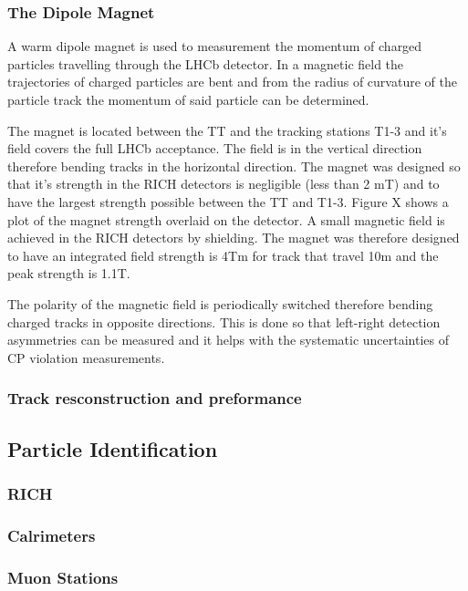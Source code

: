 \subsubsection{The Dipole Magnet}
A warm dipole magnet is used to measurement the momentum of charged particles travelling through the LHCb detector. In a magnetic field the trajectories of charged particles are bent and from the radius of curvature of the particle track the momentum of said particle can be determined.

The magnet is located between the TT and the tracking stations T1-3 and it’s field covers the full LHCb acceptance. The field is in the vertical direction therefore bending tracks in the horizontal direction. The magnet was designed so that it’s strength in the RICH detectors is negligible (less than 2 mT) and to have the largest strength possible between the TT and T1-3. Figure X shows a plot of the magnet strength overlaid on the detector. A small magnetic field is achieved in the RICH detectors by shielding. The magnet was therefore designed to have an integrated field strength is 4Tm for track that travel 10m and the peak strength is 1.1T. %

The polarity of the magnetic field is periodically switched therefore bending charged tracks in opposite directions. This is done so that left-right detection asymmetries can be measured and it helps with the systematic uncertainties of CP violation measurements. %

\subsubsection{Track resconstruction and preformance}



\subsection{Particle Identification}
\subsubsection{RICH}
\subsubsection{Calrimeters}
\subsubsection{Muon Stations}
